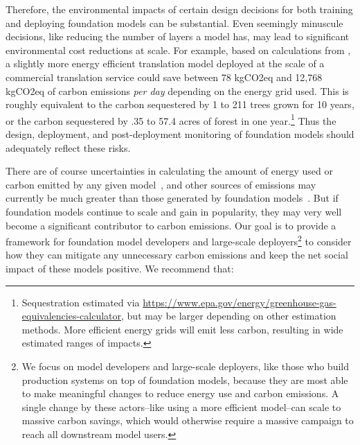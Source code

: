 Therefore, the environmental impacts of certain design decisions for both training and deploying foundation models can be substantial. Even seemingly minuscule decisions, like reducing the number of layers a model has, may lead to significant environmental cost reductions at scale. For example, based on calculations from \citet{henderson2020towards}, a slightly more energy efficient translation model deployed at the scale of a commercial translation service could save between 78 kgCO2eq and 12,768 kgCO2eq of carbon emissions \textit{per day} depending on the energy grid used. This is roughly equivalent to the carbon sequestered by 1 to 211 trees grown for 10 years, or the carbon sequestered by .35 to 57.4 acres of forest in one year.\footnote{Sequestration estimated via \url{https://www.epa.gov/energy/greenhouse-gas-equivalencies-calculator}, but may be larger depending on other estimation methods. More efficient energy grids will emit less carbon, resulting in wide estimated ranges of impacts.} Thus the design, deployment, and post-deployment monitoring of foundation models should adequately reflect these risks.

There are of course uncertainties in calculating the amount of energy used or carbon emitted by any given model~\citep{henderson2020towards,cao2020towards,patterson2021carbon}, and other sources of emissions may currently be much greater than those generated by foundation models~\citep{mora2018bitcoin}. But if foundation models continue to scale and gain in popularity, they may very well become a significant contributor to carbon emissions. Our goal is to provide a framework for foundation model developers and large-scale deployers\footnote{We focus on model developers and large-scale deployers, like those who build production systems on top of foundation models, because they are most able to make meaningful changes to reduce energy use and carbon emissions. A single change by these actors--like using a more efficient model--can scale to massive carbon savings, which would otherwise require a massive campaign to reach all downstream model users.} to consider how they can mitigate any unnecessary carbon emissions and keep the net social impact of these models positive. We recommend that:

